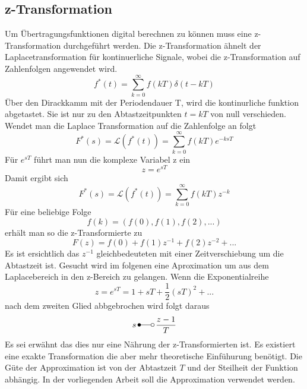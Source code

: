 \subsection{z-Transformation}
Um Übertragungsfunktionen digital berechnen zu können muss eine z-Transformation durchgeführt werden. Die z-Transformation ähnelt der Laplacetransformation für kontinuerliche Signale, wobei die z-Transformation auf Zahlenfolgen angewendet wird.
\begin{equation}
f^*(t) = \sum_{k=0}^\infty f(kT)\delta(t-kT)
\end{equation}
Über den Dirackkamm mit der Periodendauer T, wird die kontinurliche funktion abgetastet. Sie ist nur zu den Abtastzeitpunkten $t=kT$ von null verschieden. Wendet man die Laplace Transformation auf die Zahlenfolge an folgt
\begin{equation}
F^*(s) = \mathcal{L}(f^*(t)) = \sum_{k=0}^\infty f(kT)e^{-ksT}
\end{equation}
Für $e^{sT}$ führt man nun die komplexe Variabel z ein
\begin{equation}
z = e^{sT}
\end{equation}
Damit ergibt sich
\begin{equation}
F^*(s) = \mathcal{L}(f^*(t)) = \sum_{k=0}^\infty f(kT)z^{-k}
\end{equation}
Für eine beliebige Folge
\begin{equation}
f(k) = (f(0), f(1), f(2), ...)
\end{equation}
erhält man so die z-Transformierte zu
\begin{equation}
F(z) = f(0) + f(1)z^{-1} + f(2)z^{-2} + ...
\end{equation}
Es ist ersichtlich das $z^{-1}$ gleichbedeuteten mit einer Zeitverschiebung um die Abtastzeit ist. Gesucht wird im folgenen eine Aproximation um aus dem Laplacebereich in den z-Bereich zu gelangen. Wenn die Exponentialreihe 
\begin{equation}
z = e^{sT} = 1+sT+\frac{1}{2}(sT)^2 + ...
\end{equation}
nach dem zweiten Glied abbgebrochen wird folgt daraus
\begin{equation}
s\, \Laplace  \, \frac{z-1}{T}
\end{equation}
Es sei erwähnt das dies nur eine Nährung der z-Transformierten ist. Es existiert eine exakte Transformation die aber mehr theoretische Einfühurung benötigt. Die Güte der Approximation ist von der Abtastzeit $T$ und der Steilheit der Funktion abhängig. In der vorliegenden Arbeit soll die Approximation verwendet werden.
\cite[vgl.][S.501ff.]{Lunze2014}

